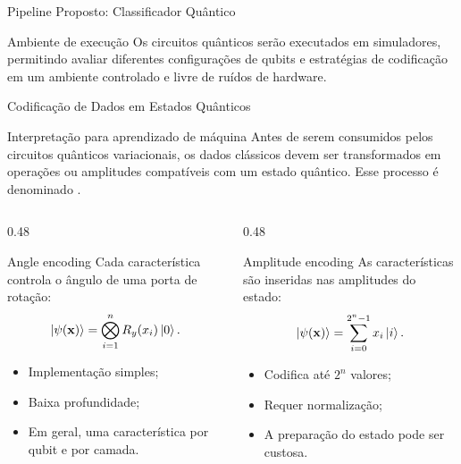 \begin{frame}[shrink=15]{Pipeline Proposto: Classificador Quântico}
  \vspace{0.2cm}

  \begin{alertblock}{Ambiente de execução}
    Os circuitos quânticos serão executados em simuladores, permitindo avaliar diferentes configurações de qubits e estratégias de codificação em um ambiente controlado e livre de ruídos de hardware.
  \end{alertblock}
\end{frame}


\begin{frame}[shrink=15]{Codificação de Dados em Estados Quânticos}

  \begin{alertblock}{Interpretação para aprendizado de máquina}
    Antes de serem consumidos pelos circuitos quânticos variacionais, os dados clássicos devem ser transformados em operações ou amplitudes
    compatíveis com um estado quântico. Esse processo é denominado
    .
  \end{alertblock}
  
  \begin{columns}[T,onlytextwidth]

    \begin{column}{0.48\textwidth}
      \begin{block}{Angle encoding}
        Cada característica controla o ângulo de uma porta de rotação:
        \[
          \ket{\psi(\mathbf{x})}
          =
          \bigotimes_{i=1}^{n}
          R_y(x_i)\ket{0}.
        \]

        \begin{itemize}
          \item Implementação simples;
          \item Baixa profundidade;
          \item Em geral, uma característica por qubit e por camada.
        \end{itemize}
      \end{block}
    \end{column}

    \begin{column}{0.48\textwidth}
      \begin{block}{Amplitude encoding}
        As características são inseridas nas amplitudes do estado:
        \[
          \ket{\psi(\mathbf{x})}
          =
          \sum_{i=0}^{2^n-1} x_i\ket{i}.
        \]

        \begin{itemize}
          \item Codifica até $2^n$ valores;
          \item Requer normalização;
          \item A preparação do estado pode ser custosa.
        \end{itemize}
      \end{block}
    \end{column}
  \end{columns}
\end{frame}


